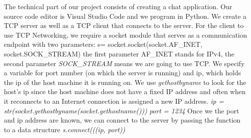 The technical part of our project consists of creating a chat application. Our source code editor is Visual Studio Code and we program in Python. We create a TCP server as well as a TCP client that connects to the server. 
For the client to use TCP Networking, we require a socket module that serves as a communication endpoint with two parameters:
s= socket.socket(socket.AF\_INET, socket.SOCK\_STREAM)
the first parameter AF_INET stands for IPv4, the second parameter \textit{SOCK\_STREAM} means we are going to use TCP. We specify a variable for port number (on which the server is running) and ip, which holds the ip of the host machine it is running on. We use \textit{gethostbyname} to look for the host’s ip since the host machine does not have a fixed IP address and often when it reconnects to an Internet connection is assigned a new IP address.
\textit{ip = str(socket.gethostbyname(socket.gethostname()))}
\textit{port = 1234}
Once we the port and ip address are known, we can connect to the server by passing the function to a data structure \textit{s.connect(((ip, port))}

